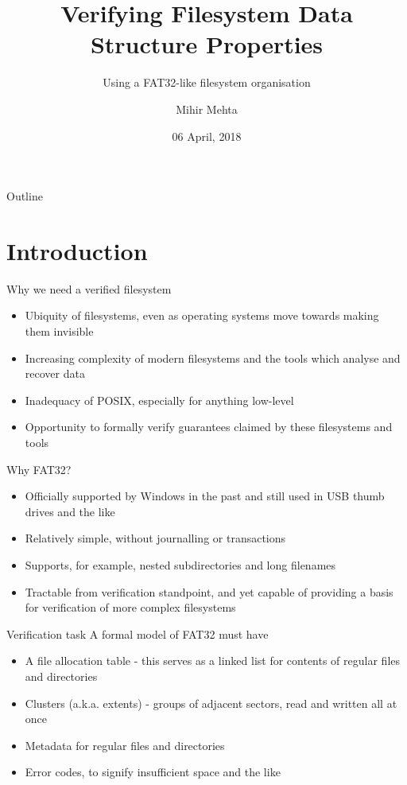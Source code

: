\documentclass{beamer}
\title{Verifying Filesystem Data Structure Properties}
\subtitle{Using a FAT32-like filesystem organisation}
\author{Mihir Mehta}
\institute{
  Department of Computer Science\\
  University of Texas at Austin\\[1ex]
  \texttt{mihir@cs.utexas.edu}
}
\date{06 April, 2018}
\begin{document}
\begin{frame}[plain]
  \titlepage
\end{frame}

\begin{frame}{Outline}
  \tableofcontents
\end{frame}


\section{Introduction}

\begin{frame}{Why we need a verified filesystem}
  \begin{itemize}
  \item Ubiquity of filesystems, even as operating systems move
    towards making them invisible
  \item Increasing complexity of modern filesystems and the tools
    which analyse and recover data
  \item Inadequacy of POSIX, especially for anything low-level
  \item Opportunity to formally verify guarantees claimed by these
    filesystems and tools
  \end{itemize}
\end{frame}

\begin{frame}{Why FAT32?}
  \begin{itemize}
  \item Officially supported by Windows in the past and still used in USB
    thumb drives and the like
  \item Relatively simple, without journalling or transactions
  \item Supports, for example, nested subdirectories and long filenames
  \item Tractable from verification standpoint, and yet capable of
    providing a basis for verification of more complex filesystems
  \end{itemize}
\end{frame}

\begin{frame}{Verification task}
  A formal model of FAT32 must have
  \begin{itemize}
  \item A file allocation table - this serves as a linked list for
    contents of regular files and directories \checkmark
  \item Clusters (a.k.a. extents) - groups of adjacent sectors, read
    and written all at once
  \item Metadata for regular files and directories
  \item Error codes, to signify insufficient space and the like \checkmark
  \end{itemize}
\end{frame}
\end{document}
